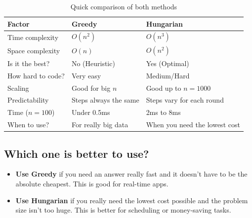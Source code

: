 \documentclass[12pt,a4paper]{article}
\begin{document}
\begin{table}[H]
    \centering
    \caption{Quick comparison of both methods}
    \label{tab:comparison}
    \begin{tabularx}{\linewidth}{lXX}
        \toprule
        \textbf{Factor}             & \textbf{Greedy}                     & \textbf{Hungarian}                   \\
        \midrule
        Time complexity             & $O(n^2)$                            & $O(n^3)$                             \\
        Space complexity            & $O(n)$                              & $O(n^2)$                             \\
        Is it the best?             & No (Heuristic)                      & Yes (Optimal)                        \\
        How hard to code?           & Very easy                           & Medium/Hard                          \\
        Scaling                     & Good for big $n$                    & Good up to $n=1000$                  \\
        Predictability              & Steps always the same               & Steps vary for each round            \\
        Time ($n=100$)              & Under 0.5ms                         & 2ms to 8ms                           \\
        When to use?                & For really big data                 & When you need the lowest cost        \\
        \bottomrule
    \end{tabularx}
\end{table}

\subsection{Which one is better to use?}

\begin{itemize}
    \item \textbf{Use Greedy} if you need an answer really fast and it doesn't 
          have to be the absolute cheapest. This is good for real-time apps.
    \item \textbf{Use Hungarian} if you really need the lowest cost possible 
          and the problem size isn't too huge. This is better for scheduling 
          or money-saving tasks.
\end{itemize}
\end{document}
